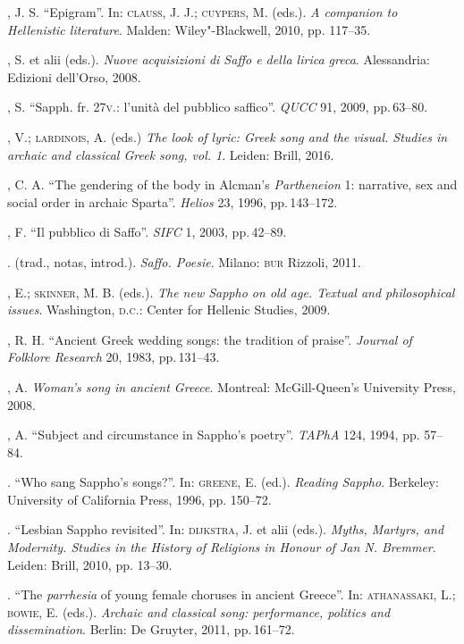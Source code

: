 \begin{bibliohedra}
, J. S. “Epigram”. In: \textsc{clauss}, J. J.; \textsc{cuypers}, M. (eds.). \textit{A companion to Hellenistic literature}. Malden: Wiley"-Blackwell, 2010, pp. 117--35. 

, S. et alii (eds.). \textit{Nuove acquisizioni di Saffo e della lirica greca}. Alessandria: Edizioni dell'Orso, 2008.

, S. “Sapph. fr. 27\textsc{v}.: l’unità del pubblico saffico”. \textit{QUCC} 91, 2009, pp.\,63--80.

, V.; \textsc{lardinois}, A. (eds.) \textit{The look of lyric: Greek song and the visual. Studies in archaic and classical Greek song, vol. 1}. Leiden: Brill, 2016.

, C. A. “The gendering of the body in Alcman’s \textit{Partheneion} 1: narrative, sex and social order in archaic Sparta”. \textit{Helios} 23, 1996, pp.\,143--172.

, F. “Il pubblico di Saffo”. \textit{SIFC} 1, 2003, pp.\,42--89.

\titidem. (trad., notas, introd.). \textit{Saffo. Poesie}. Milano: \textsc{bur} Rizzoli, 2011.

, E.; \textsc{skinner}, M. B. (eds.). \textit{The new Sappho on old age. Textual and philosophical issues}. Washington, \textsc{d.c.}: Center for Hellenic Studies, 2009.

, R. H. “Ancient Greek wedding songs: the tradition of praise”. \textit{Journal of Folklore Research} 20, 1983, pp.\,131--43.

, A. \textit{Woman’s song in ancient Greece}. Montreal: McGill-Queen’s University Press, 2008. 

, A. “Subject and circumstance in Sappho’s poetry”. \textit{TAPhA} 124, 1994, pp. 57--84.

\titidem. “Who sang Sappho’s songs?”. In: \textsc{greene}, E. (ed.). \textit{Reading Sappho}. Berkeley: University of California Press, 1996, pp. 150--72.

\titidem. ``Lesbian Sappho revisited''. In: \textsc{dijkstra}, J. et alii (eds.). \textit{Myths, Martyrs, and Modernity. Studies in the History of Religions in Honour of Jan N. Bremmer}. Leiden: Brill, 2010, pp. 13--30.

\titidem. “The \textit{parrhesia} of young female choruses in ancient Greece”. In: \textsc{athanassaki}, L.; \textsc{bowie}, E. (eds.). \textit{Archaic and classical song: performance, politics and dissemination}. Berlin: De Gruyter, 2011, pp.\,161--72. 


\end{bibliohedra}
